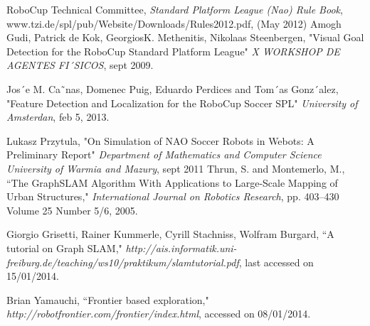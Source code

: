 \documentclass{ba-kecs}
\numberwithin{figure}{section}
\numberwithin{equation}{section}
\begin{document}
\begin{thebibliography}{99}

 RoboCup Technical Committee, \textit{Standard Platform League (Nao) Rule Book}, www.tzi.de/spl/pub/Website/Downloads/Rules2012.pdf, (May 2012)
 Amogh Gudi, Patrick de Kok, GeorgiosK. Methenitis, Nikolaas Steenbergen, "Visual Goal Detection for the RoboCup Standard Platform League" \emph{X WORKSHOP DE AGENTES FI´SICOS}, sept 2009.

 Jos´e M. Ca˜nas, Domenec Puig, Eduardo Perdices and Tom´as Gonz´alez, "Feature Detection and Localization for the
RoboCup Soccer SPL" \emph{University of Amsterdan}, feb 5, 2013.

 Lukasz Przytula, "On Simulation of NAO Soccer Robots in Webots: A Preliminary Report" \emph{Department of Mathematics and Computer Science University of Warmia and Mazury}, sept 2011
 Thrun, S. and Montemerlo, M., ``The GraphSLAM Algorithm With Applications to Large-Scale Mapping of Urban Structures," \emph{International Journal on Robotics Research}, pp. 403--430 Volume 25 Number 5/6, 2005.

 Giorgio Grisetti, Rainer Kummerle, Cyrill Stachniss, Wolfram Burgard, ``A tutorial on Graph SLAM," \emph{http://ais.informatik.uni-freiburg.de/teaching/ws10/praktikum/slamtutorial.pdf}, last accessed on 15/01/2014.
 
 Brian Yamauchi, ``Frontier based exploration," \emph{http://robotfrontier.com/frontier/index.html}, accessed on 08/01/2014. 



\end{thebibliography}
\end{document}
